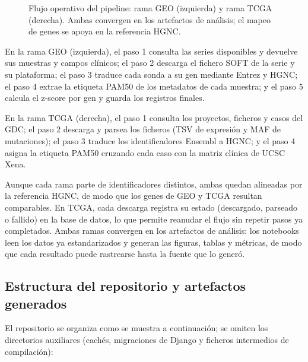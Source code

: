 \documentclass[12pt, a4paper]{report}
\begin{document}
\begin{figure}[htbp]
\caption[Flujo operativo del pipeline por fuente.]{Flujo operativo del pipeline: rama GEO (izquierda) y rama TCGA (derecha). Ambas convergen en los artefactos de análisis; el mapeo de genes se apoya en la referencia HGNC.}
\label{fig:flujo_pipeline}
\end{figure}

En la rama GEO (izquierda), el paso 1 consulta las series disponibles y devuelve sus muestras y campos clínicos; el paso 2 descarga el fichero SOFT de la serie y su plataforma; el paso 3 traduce cada sonda a su gen mediante Entrez y HGNC; el paso 4 extrae la etiqueta PAM50 de los metadatos de cada muestra; y el paso 5 calcula el z-score por gen y guarda los registros finales.

En la rama TCGA (derecha), el paso 1 consulta los proyectos, ficheros y casos del GDC; el paso 2 descarga y parsea los ficheros (TSV de expresión y MAF de mutaciones); el paso 3 traduce los identificadores Ensembl a HGNC; y el paso 4 asigna la etiqueta PAM50 cruzando cada caso con la matriz clínica de UCSC Xena.

Aunque cada rama parte de identificadores distintos, ambas quedan alineadas por la referencia HGNC, de modo que los genes de GEO y TCGA resultan comparables. En TCGA, cada descarga registra su estado (descargado, parseado o fallido) en la base de datos, lo que permite reanudar el flujo sin repetir pasos ya completados. Ambas ramas convergen en los artefactos de análisis: los notebooks leen los datos ya estandarizados y generan las figuras, tablas y métricas, de modo que cada resultado puede rastrearse hasta la fuente que lo generó.

\subsection{Estructura del repositorio y artefactos generados}

El repositorio se organiza como se muestra a continuación; se omiten los directorios auxiliares (cachés, migraciones de Django y ficheros intermedios de compilación):
\end{document}
